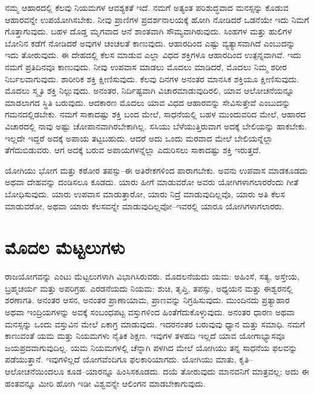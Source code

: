ನಮ್ಮ ಆಹಾರದಲ್ಲಿ ಕೆಲವು ನಿಯಮಗಳ ಆವಶ್ಯಕತೆ ಇದೆ. ನಮಗೆ ಅತ್ಯಂತ ಪರಿಶುದ್ಧವಾದ ಮನಸ್ಸನ್ನು ಕೊಡುವ ಆಹಾರವನ್ನೇ ಉಪಯೋಗಿಸಬೇಕು. ನೀವು ಪ್ರಾಣಿಗಳ ಪ್ರದರ್ಶನಾಲಯಕ್ಕೆ ಹೋಗಿ ನೋಡಿದರೆ ಒಡನೆಯೇ ಇದು ನಿಮಗೆ ಗೊತ್ತಾಗುವುದು. ಬಹಳ ದೊಡ್ಡ ಮೃಗವಾದ ಆನೆ ಶಾಂತವಾಗಿ ಸೌಮ್ಯವಾಗಿರುವುದು. ಸಿಂಹಗಳ ಮತ್ತು ಹುಲಿಗಳ ಬೋನಿನ ಕಡೆಗೆ ನೋಡಿದರೆ ಅವುಗಳ ಚಂಚಲತೆ ಕಾಣುವುದು. ಆಹಾರದಿಂದ ಎಷ್ಟು ವ್ಯತ್ಯಾಸವಾಗಿದೆ ಎಂಬುದನ್ನು ಇದು ತೋರುವುದು. ಈ ದೇಹದಲ್ಲಿ ಕೆಲಸ ಮಾಡುವ ಎಲ್ಲಾ ವಿಧದ ಶಕ್ತಿಗಳೂ ಆಹಾರದಿಂದ ಉತ್ಪನ್ನವಾಗಿವೆ. ಇದು ನಮಗೆ ಪ್ರತಿದಿನವೂ ಕಾಣುವುದು. ನೀವು ಉಪವಾಸ ಮಾಡಲು ಮೊದಲು ಮಾಡಿದರೆ, ಮೊದಲು ನಿಮ್ಮ ಶರೀರ ನಿರ್ಬಲವಾಗುವುದು. ಶಾರೀರಿಕ ಶಕ್ತಿ ಕ್ಷೀಣಿಸುವುದು. ಕೆಲವು ದಿನಗಳ ಅನಂತರ ಮಾನಸಿಕ ಶಕ್ತಿಯೂ ಕ್ಷೀಣಿಸುವುದು. ಮೊದಲು ಸ್ಮೃತಿ ಶಕ್ತಿ ನಿಲ್ಲುವುದು. ಅನಂತರ, ನಿರ್ದಿಷ್ಟವಾಗಿ ವಿಚಾರಮಾಡುವುದಿರಲಿ, ಯಾವ ಆಲೋಚನೆಯನ್ನೂ ಮಾಡಲಾಗದ ಸ್ಥಿತಿ ಬರುವುದು. ಆದಕಾರಣ ಮೊದಲು ಯಾವ ವಿಧದ ಆಹಾರವನ್ನು ಸೇವಿಸುತ್ತೇವೆ ಎಂಬುದನ್ನು ಗಮನದಲ್ಲಿಡಬೇಕು. ನಮಗೆ ಸಾಕಾದಷ್ಟು ಶಕ್ತಿ ಬಂದ ಮೇಲೆ, ಸಾಧನೆಯಲ್ಲಿ ಬಹಳ ಮುಂದುವರಿದ ಮೇಲೆ, ಆಹಾರದ ವಿಚಾರದಲ್ಲಿ ನಾವು ಅಷ್ಟು ಚೋಪಾನವಾಗಿರಬೇಕಾಗಿಲ್ಲ. ಸಸಿಯು ಬೆಳೆಯುತ್ತಿರುವಾಗ ಅದಕ್ಕೆ ಬೇಲಿಯನ್ನು ಹಾಕಬೇಕು. ಇಲ್ಲದೇ ಇದ್ದರೆ ಅದಕ್ಕೆ ಅಪಾಯ ತಟ್ಟಬಹುದು. ಆದರೆ ಅದು ಒಂದು ಮರವಾದ ಮೇಲೆ ಬೇಲಿಯನ್ನೆಲ್ಲಾ ತೆಗೆದುಬಿಡುವರು. ಆಗ ಅದಕ್ಕೆ ಬರುವ ಅಪಾಯಗಳನ್ನೆಲ್ಲಾ ಎದುರಿಸಲು ಸಾಕಾದಷ್ಟು ಶಕ್ತಿ ಇರುತ್ತದೆ. 

ಯೋಗಿಯು ಭೋಗ ಮತ್ತು ಕಠೋರ ತಪಸ್ಸು–ಈ ಅತಿರೇಕಗಳಿಂದ ಪಾರಾಗಬೇಕು. ಅವನು ಉಪವಾಸ ಮಾಡಕೂಡದು ಅಥವಾ ದೇಹವನ್ನು ದಂಡಿಸಲೂ ಕೂಡದು. ಯಾರು ಹೀಗೆ ಮಾಡುವರೋ ಅವರು ಯೋಗಿಗಳಾಗಲಾರರೆಂದು ಗೀತೆ ಬೋಧಿಸುವುದು. ಯಾರು ಉಪವಾಸ ಮಾಡುತ್ತಾರೋ, ಯಾರು ನಿದ್ರೆ ಮಾಡುವುದಿಲ್ಲವೊ, ಯಾರು ಅತಿ ಕೆಲಸ ಮಾಡುವರೋ, ಅಥವಾ ಯಾರು ಕೆಲಸವನ್ನೇ ಮಾಡುವುದಿಲ್ಲವೋ–ಇವರಲ್ಲಿ ಯಾರೂ ಯೋಗಿಗಳಾಗಲಾರರು.

\chapter{ಮೊದಲ ಮೆಟ್ಟಲುಗಳು}

ರಾಜಯೋಗವನ್ನು ಎಂಟು ಮೆಟ್ಟಲುಗಳಾಗಿ ವಿಭಾಗಿಸಿರುವರು. ಮೊದಲನೆಯದು ಯಮ: ಅಹಿಂಸೆ, ಸತ್ಯ, ಅಸ್ತೇಯ, ಬ್ರಹ್ಮಚರ್ಯ ಮತ್ತು ಅಪರಿಗ್ರಹ. ಎರಡನೆಯದು ನಿಯಮ: ಶುಚಿ, ತೃಪ್ತಿ, ತಪಸ್ಸು, ಅಧ್ಯಯನ ಮತ್ತು ಈಶ್ವರನಲ್ಲಿ ಶರಣಾಗತಿ. ಅನಂತರ ಆಸನ, ಅನಂತರ ಪ್ರಾಣಾಯಾಮ, ಪ್ರಾಣವನ್ನು ನಿಗ್ರಹಿಸುವುದು. ಮುಂದಿನದು ಪ್ರತ್ಯಾಹಾರ ಅಥವಾ ಇಂದ್ರಿಯಗಳನ್ನು ಅವಕ್ಕೆ ಸಂಬಂಧಪಟ್ಟ ವಸ್ತುಗಳಿಂದ ಹಿಂತೆಗೆದುಕೊಳ್ಳುವುದು. ಅನಂತರ ಧಾರಣ ಅಥವಾ ಮನಸ್ಸನ್ನು ಒಂದು ವಸ್ತುವಿನ ಮೇಲೆ ಏಕಾಗ್ರ ಮಾಡುವುದು. ಇದರನಂತರ ಬರುವುವು ಧ್ಯಾನ ಮತ್ತು ಸಮಾಧಿ. ನಮಗೆ ಕಾಣುವಂತೆ ಯಮ ಮತ್ತು ನಿಯಮಗಳು ನೈತಿಕ ಶಿಕ್ಷಣ. ಇವುಗಳ ತಳಹದಿ ಇಲ್ಲದೆ ಯಾವ ಯೋಗಾಭ್ಯಾಸವೂ ಜಯಪ್ರದವಾಗುವುದಿಲ್ಲ. ಯಮ ನಿಯಮಗಳಲ್ಲಿ ಚೆನ್ನಾಗಿ ಪಳಗಿದ ಮೇಲೆ ಯೋಗಿಯು ತನ್ನ ಸಾಧನೆಯ ಫಲವನ್ನು ಪಡೆಯುತ್ತಾನೆ. ಇವುಗಳಿಲ್ಲದೆ ಯೋಗವೆಂದಿಗೂ ಫಲಕಾರಿಯಾಗದು. ಯೋಗಿಯು ಮಾತು, ಕೃತಿ–ಆಲೋಚನೆಯಿಂದಲೂ ಕೂಡ–ಯಾರನ್ನೂ ಹಿಂಸಿಸಕೂಡದು. ದಯೆ ತೋರುವುದು ಮಾನವನಿಗೆ ಮಾತ್ರವಲ್ಲ; ಅದು ಈ ಹಂತವನ್ನೂ ಮೀರಿ ಹೋಗಿ ಇಡೀ ವಿಶ್ವವನ್ನೇ ಆಲಿಂಗನ ಮಾಡಬೇಕಾಗುವುದು. 

